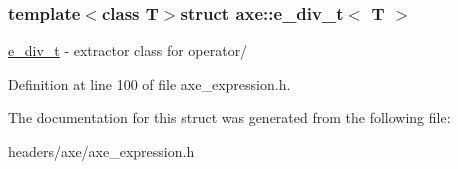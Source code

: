 \subsubsection*{template$<$class T$>$struct axe\+::e\+\_\+div\+\_\+t$<$ T $>$}

\hyperlink{structaxe_1_1e__div__t}{e\+\_\+div\+\_\+t} -\/ extractor class for operator/ 

Definition at line 100 of file axe\+\_\+expression.\+h.



The documentation for this struct was generated from the following file\+:\begin{DoxyCompactItemize}
\item 
headers/axe/axe\+\_\+expression.\+h\end{DoxyCompactItemize}
